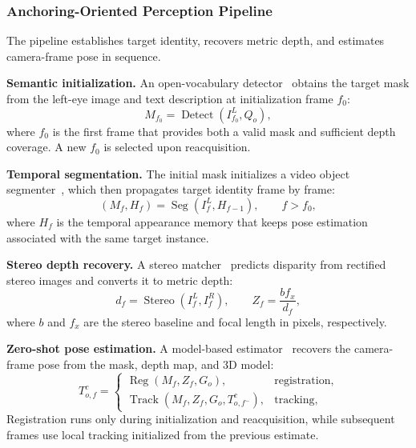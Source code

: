 \documentclass[review]{vgtc}
\begin{document}
\subsubsection{Anchoring-Oriented Perception Pipeline}

The pipeline establishes target identity, recovers metric depth, and estimates camera-frame pose in sequence.

\textbf{Semantic initialization.} An open-vocabulary detector~\cite{yoloe2025} obtains the target mask from the left-eye image and text description at initialization frame $f_0$:
\begin{equation}
M_{f_0} = \operatorname{Detect}(I_{f_0}^{L}, Q_o),
\label{eq:detect}
\end{equation}
where $f_0$ is the first frame that provides both a valid mask and sufficient depth coverage. A new $f_0$ is selected upon reacquisition.

\textbf{Temporal segmentation.} The initial mask initializes a video object segmenter~\cite{cutie2024}, which then propagates target identity frame by frame:
\begin{equation}
(M_f, H_f) = \operatorname{Seg}(I_f^{L}, H_{f-1}), \qquad f > f_0,
\label{eq:seg}
\end{equation}
where $H_f$ is the temporal appearance memory that keeps pose estimation associated with the same target instance.

\textbf{Stereo depth recovery.} A stereo matcher~\cite{fastfoundationstereo2026} predicts disparity from rectified stereo images and converts it to metric depth:
\begin{equation}
d_f = \operatorname{Stereo}(I_f^{L}, I_f^{R}), \qquad Z_f = \frac{b f_x}{d_f},
\label{eq:depth}
\end{equation}
where $b$ and $f_x$ are the stereo baseline and focal length in pixels, respectively.

\textbf{Zero-shot pose estimation.} A model-based estimator~\cite{foundationpose2024} recovers the camera-frame pose from the mask, depth map, and 3D model:
\begin{equation}
T_{o,f}^{c} =
\begin{cases}
\operatorname{Reg}(M_f, Z_f, G_o), & \text{registration}, \\
\operatorname{Track}(M_f, Z_f, G_o, T_{o,f^-}^{c}), & \text{tracking},
\end{cases}
\label{eq:pose}
\end{equation}
Registration runs only during initialization and reacquisition, while subsequent frames use local tracking initialized from the previous estimate.
\end{document}
